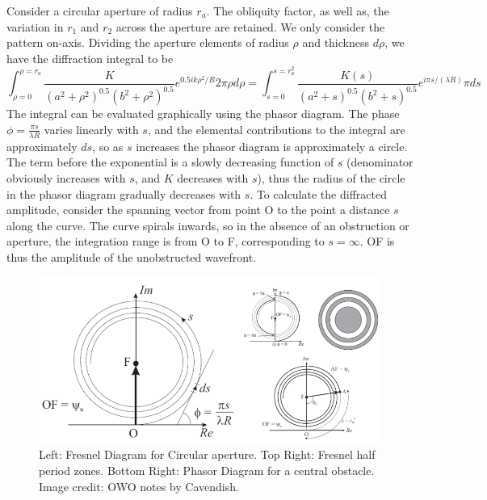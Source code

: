 \documentclass[a4paper]{article}
\begin{document}
\begin{eg}
Consider a circular aperture of radius $r_a$. The obliquity factor, as well as, the variation in $r_1$ and $r_2$ across the aperture are retained. We only consider the pattern on-axis. Dividing the aperture elements of radius $\rho$ and thickness $d\rho$, we have the diffraction integral to be
$$\int_{\rho=0}^{\rho=r_a}\frac{K}{(a^2+\rho^2)^{0.5}(b^2+\rho^2)^{0.5}}e^{0.5ik\rho^2/R}2\pi\rho d\rho=\int_{s=0}^{s=r_a^2}\frac{K(s)}{(a^2+s)^{0.5}(b^2+s)^{0.5}}e^{i\pi s/(\lambda R)}\pi ds$$
The integral can be evaluated graphically using the phasor diagram. The phase $\phi=\frac{\pi s}{\lambda R}$ varies linearly with $s$, and the elemental contributions to the integral are approximately $ds$, so as $s$ increases the phasor diagram is approximately a circle. The term before the exponential is a slowly decreasing function of $s$ (denominator obviously increases with $s$, and $K$ decreases with $s$), thus the radius of the circle in the phasor diagram gradually decreases with $s$. To calculate the diffracted amplitude, consider the spanning vector from point O to the point a distance $s$ along the curve. The curve spirals inwards, so in the absence of an obstruction or aperture, the integration range is from O to F, corresponding to $s=\infty$. OF is thus the amplitude of the unobstructed wavefront.
\end{eg}
\begin{figure}[H]
    \centering
    \includegraphics[width=\linewidth]{fresnelcircular.PNG}
    \caption{Left: Fresnel Diagram for Circular aperture. Top Right: Fresnel half period zones. Bottom Right: Phasor Diagram for a central obstacle. Image credit: OWO notes by Cavendish.}
\end{figure}
\newpage
\end{document}

